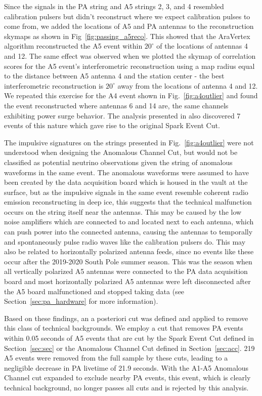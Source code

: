       Since the signals in the PA string and A5 strings 2, 3, and 4 resembled calibration pulsers but didn't reconstruct where we expect calibration pulses to come from, we added the locations of A5 and PA antennas to the reconstruction skymaps as shown in Fig~\ref{fig:passing_a5reco}.
      This showed that the AraVertex algorithm reconstructed the A5 event within $20^{\circ}$ of the locations of antennas 4 and 12. 
      The same effect was observed when we plotted the skymap of correlation scores for the A5 event's interferometric reconstruction using a map radius equal to the distance between A5 antenna 4 and the station center - the best interferometric reconstruction is $20^{\circ}$ away from the locations of antenna 4 and 12. 
      We repeated this exercise for the A4 event shown in Fig.~\ref{fig:a4outlier} and found the event reconstructed where antennas 6 and 14 are, the same channels exhibiting power surge behavior.
      The analysis presented in \citep{ara_a23} also discovered 7 events of this nature which gave rise to the original Spark Event Cut.%

      The impulsive signatures on the strings presented in Fig.~\ref{fig:a4outlier} were not understood when designing the Anomalous Channel Cut, but would not be classified as potential neutrino observations given the string of anomalous waveforms in the same event. 
      The anomalous waveforms were assumed to have been created by the data acquisition board which is housed in the vault at the surface, but as the impulsive signals in the same event resemble coherent radio emission reconstructing in deep ice, this suggests that the technical malfunction occurs on the string itself near the antennas. 
      This may be caused by the low noise amplifiers which are connected to and located next to each antenna, which can push power into the connected antenna, causing the antennas to temporally and spontaneously pulse radio waves like the calibration pulsers do.
      This may also be related to horizontally polarized antenna feeds, since no events like these occur after the 2019-2020 South Pole summer season.
      This was the season when all vertically polarized A5 antennas were connected to the PA data acquisition board and most horizontally polarized A5 antennas were left disconnected after the A5 board malfunctioned and stopped taking data (see Section~\ref{sec:pa_hardware} for more information).

      Based on these findings, an a posteriori cut was defined and applied to remove this class of technical backgrounds.
      We employ a cut that removes PA events within 0.05 seconds of A5 events that are cut by the Spark Event Cut defined in Section~\ref{sec:sec} or the Anomalous Channel Cut defined in Section~\ref{sec:acc}.
      219 A5 events were removed from the full sample by these cuts, leading to a negligible decrease in PA livetime of 21.9 seconds. 
      With the A1-A5 Anomalous Channel cut expanded to exclude nearby PA events, this event, which is clearly technical background, no longer passes all cuts and is rejected by this analysis.

